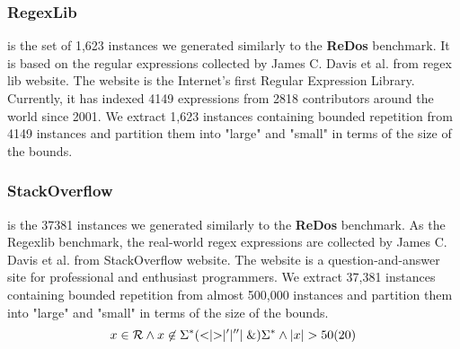\documentclass{standalone}
\begin{document}
\subsubsection{RegexLib} is the set of 1,623 instances we generated similarly to the \textbf{ReDos} benchmark. It is based on the regular expressions collected by James C. Davis et al.\cite{regex_lingua_franca} from regex lib website\cite{regexlib}. The website is the Internet's first Regular Expression Library. Currently, it has indexed 4149 expressions from 2818 contributors around the world since 2001. We extract 1,623 instances containing bounded repetition from 4149 instances and partition them into "large" and "small" in terms of the size of the bounds.
\subsubsection{StackOverflow} is the 37381 instances we generated similarly to the \textbf{ReDos} benchmark. As the Regexlib benchmark, the real-world regex expressions are collected by James C. Davis et al.\cite{regex_lingua_franca} from StackOverflow website\cite{stackoverflow}. The website is a question-and-answer site for professional and enthusiast programmers. We extract 37,381 instances containing bounded repetition from almost 500,000 instances and partition them into "large" and "small" in terms of the size of the bounds.
\begin{equation} \label{eq:template}
  x\in \mathcal{R} \wedge x\not\in \Sigma^*(<\mid >\mid '\mid ''\mid \&)\Sigma^*\wedge |x| > 50(20)
\end{equation}
\end{document}
